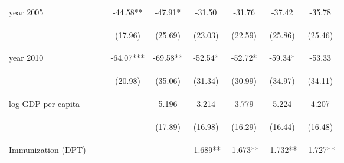 \begin{table}[htpb!]
\begin{center}
\begin{tabular}{lcccccccc}
year 2005&&&-44.58**&-47.91*&-31.50&-31.76&-37.42&-35.78\\
&&&\begin{footnotesize}(17.96)\end{footnotesize}&\begin{footnotesize}(25.69)\end{footnotesize}&\begin{footnotesize}(23.03)\end{footnotesize}&\begin{footnotesize}(22.59)\end{footnotesize}&\begin{footnotesize}(25.86)\end{footnotesize}&\begin{footnotesize}(25.46)\end{footnotesize}\\
year 2010&&&-64.07***&-69.58**&-52.54*&-52.72*&-59.34*&-53.33\\
&&&\begin{footnotesize}(20.98)\end{footnotesize}&\begin{footnotesize}(35.06)\end{footnotesize}&\begin{footnotesize}(31.34)\end{footnotesize}&\begin{footnotesize}(30.99)\end{footnotesize}&\begin{footnotesize}(34.97)\end{footnotesize}&\begin{footnotesize}(34.11)\end{footnotesize}\\
log GDP per capita&&&&5.196&3.214&3.779&5.224&4.207\\
&&&&\begin{footnotesize}(17.89)\end{footnotesize}&\begin{footnotesize}(16.98)\end{footnotesize}&\begin{footnotesize}(16.29)\end{footnotesize}&\begin{footnotesize}(16.44)\end{footnotesize}&\begin{footnotesize}(16.48)\end{footnotesize}\\
Immunization (DPT) &&&&&-1.689**&-1.673**&-1.732**&-1.727**\\

\end{tabular}
\end{center}
\end{table}
